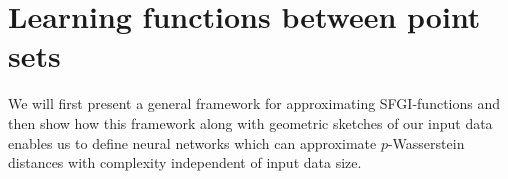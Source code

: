 \documentclass[12pt]{article}
\newcommand{\samedit}[1]{{{\textcolor{darkblue}{#1}}}}
\newcommand{\SFGI} {{SFGI}}
\begin{document}

\section{Learning functions between point sets}
We will first present a general framework for approximating \SFGI-functions and then show how this framework along with geometric sketches of our input data enables us to define neural networks which can approximate $p$-Wasserstein distances with complexity independent of input data size.
\end{document}
